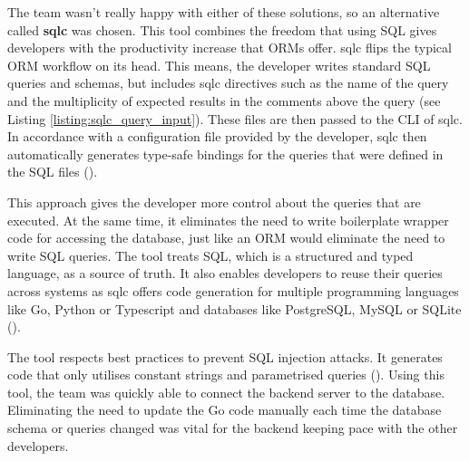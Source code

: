 The team wasn't really happy with either of these solutions, so an alternative
called \textbf{sqlc} was chosen. This tool combines the freedom that using SQL gives
developers with the productivity increase that ORMs offer. sqlc flips the
typical ORM workflow on its head. This means, the developer writes standard SQL
queries and schemas, but includes sqlc directives such as the name of the query
and the multiplicity of expected results in the comments above the query (see
Listing \ref{listing:sqlc_query_input}). These files are then passed to the CLI
of sqlc. In accordance with a configuration file provided by the developer, sqlc
then automatically generates type-safe bindings for the queries that were
defined in the SQL files (\cite{sqlc_introduction}).

This approach gives the developer more control about the queries that are
executed. At the same time, it eliminates the need to write boilerplate wrapper
code for accessing the database, just like an ORM would eliminate the need to
write SQL queries. The tool treats SQL, which is a structured and typed
language, as a source of truth. It also enables developers to reuse their
queries across systems as sqlc offers code generation for multiple programming
languages like Go, Python or Typescript and databases like PostgreSQL, MySQL or
SQLite (\cite{sqlc_documentation_language_support}).

The tool respects best practices to prevent SQL injection attacks. It generates
code that only utilises constant strings and parametrised queries
(\cite{sqlc_injection}). Using this tool, the team was quickly able to
connect the backend server to the database. Eliminating the need to update the
Go code manually each time the database schema or queries changed was vital for
the backend keeping pace with the other developers.

